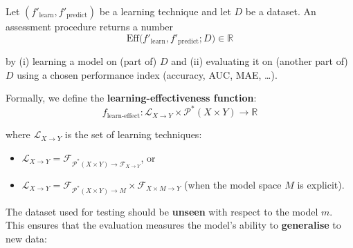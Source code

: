 \begin{definitionblock}
Let $(f'_{\text{learn}}, f'_{\text{predict}})$ be a learning technique and let $D$ be a dataset.
An assessment procedure returns a number
$$
\text{Eff}\bigl(f'_{\text{learn}}, f'_{\text{predict}}; D\bigr) \in \mathbb{R}
$$

\vspace{-0.3em}
by (i) learning a model on (part of) $D$ and (ii) evaluating it on (another part of) $D$ using a chosen performance index (accuracy, AUC, MAE, \dots).

\medskip

Formally, we define the \textbf{learning-effectiveness function}:
$$
f_{\text{learn-effect}} : \mathcal{L}_{X \to Y} \times \mathcal{P}^*(X \times Y) \to \mathbb{R}
$$

\vspace{-0.4em}
where $\mathcal{L}_{X \to Y}$ is the set of learning techniques:
\begin{itemize}
    \item $\mathcal{L}_{X \to Y} = \mathcal{F}_{\mathcal{P}^*(X \times Y) \to \mathcal{F}_{X \to Y}}$, or
    \item $\mathcal{L}_{X \to Y} = \mathcal{F}_{\mathcal{P}^*(X \times Y) \to M} \times \mathcal{F}_{X \times M \to Y}$ (when the model space $M$ is explicit).
\end{itemize}
\end{definitionblock}

The dataset used for testing should be \textbf{unseen} with respect to the model $m$. This ensures that the evaluation measures the model's ability to \textbf{generalise} to new data:

